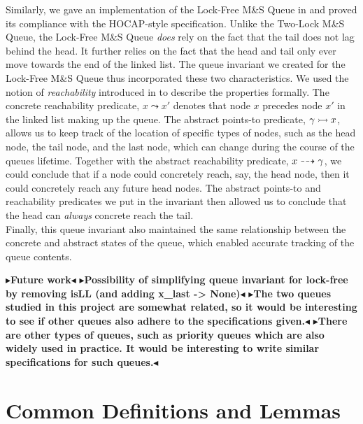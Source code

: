 \documentclass[a4paper, 10pt]{report}
\theoremstyle{definition}
\newcommand{\msq}{M\&S Queue}
\newcommand{\tlmsq}{Two-Lock \msq{}}
\newcommand{\lfmsq}{Lock-Free \msq{}}
\newcommand{\node}{x}
\newcommand{\reach}[2]{#1 \leadsto #2}
\newcommand{\ar}[2]{#1 \dashrightarrow #2}
\newcommand{\ap}[2]{#1 \rightarrowtail #2}
\newcommand{\todo}[1]{{\color[rgb]{.5,0,0}\textbf{$\blacktriangleright$#1$\blacktriangleleft$}}}
\begin{document}
Similarly, we gave an implementation of the \lfmsq{} in \heaplang{} and proved its compliance with the HOCAP-style specification. Unlike the \tlmsq{}, the \lfmsq{} \emph{does} rely on the fact that the tail does not lag behind the head. It further relies on the fact that the head and tail only ever move towards the end of the linked list. The queue invariant we created for the \lfmsq{} thus incorporated these two characteristics. We used the notion of \textit{reachability} introduced in \citet{DBLP:conf/cpp/VindumB21} to describe the properties formally. The concrete reachability predicate, $\reach{\node}{\node'}$ denotes that node $\node$ precedes node $\node'$ in the linked list making up the queue. The abstract points-to predicate, $\ap{\gname}{\node}$, allows us to keep track of the location of specific types of nodes, such as the head node, the tail node, and the last node, which can change during the course of the queues lifetime. Together with the abstract reachability predicate, $\ar{\node}{\gname}$, we could conclude that if a node could concretely reach, say, the head node, then it could concretely reach any future head nodes. The abstract points-to and reachability predicates we put in the invariant then allowed us to conclude that the head can \emph{always} concrete reach the tail.\\
Finally, this queue invariant also maintained the same relationship between the concrete and abstract states of the queue, which enabled accurate tracking of the queue contents.

\todo{Future work}
\todo{Possibility of simplifying queue invariant for lock-free by removing isLL (and adding x\_last -> None)}
\todo{The two queues studied in this project are somewhat related, so it would be interesting to see if other queues also adhere to the specifications given.}
\todo{There are other types of queues, such as priority queues which are also widely used in practice. It would be interesting to write similar specifications for such queues.}


\cleardoublepage
{}




\cleardoublepage
\appendix
\chapter{Common Definitions and Lemmas}\label{ch:appendix:common}
\end{document}
